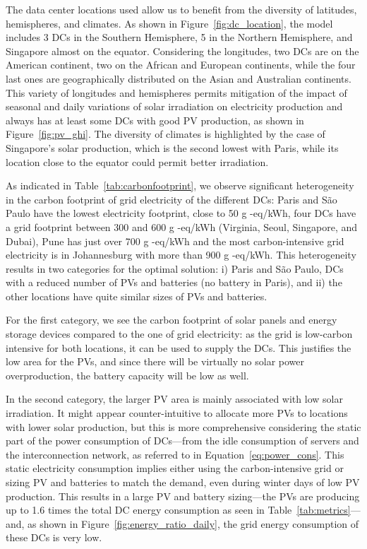 The data center locations used allow us to benefit from the diversity of latitudes, hemispheres, and climates. As shown in Figure~\ref{fig:dc_location}, the model includes 3 DCs in the Southern Hemisphere, 5 in the Northern Hemisphere, and Singapore almost on the equator. Considering the longitudes, two DCs are on the American continent, two on the African and European continents, while the four last ones are geographically distributed on the Asian and Australian continents. This variety of longitudes and hemispheres permits mitigation of the impact of seasonal and daily variations of solar irradiation on electricity production and always has at least some DCs with good PV production, as shown in Figure~\ref{fig:pv_ghi}. The diversity of climates is highlighted by the case of Singapore's solar production, which is the second lowest with Paris, while its location close to the equator could permit better irradiation.

As indicated in Table~\ref{tab:carbonfootprint}, we observe significant heterogeneity in the carbon footprint of grid electricity of the different DCs: Paris and S\~ao Paulo have the lowest electricity footprint, close to 50 g -eq/kWh, four DCs have a grid footprint between 300 and 600 g -eq/kWh (Virginia, Seoul, Singapore, and Dubai), Pune has just over 700 g -eq/kWh and the most carbon-intensive grid electricity is in Johannesburg with more than 900 g -eq/kWh. This heterogeneity results in two categories for the optimal solution: i) Paris and S\~ao Paulo, DCs with a reduced number of PVs and batteries (no battery in Paris), and ii) the other locations have quite similar sizes of PVs and batteries. 

For the first category, we see the carbon footprint of solar panels and energy storage devices compared to the one of grid electricity: as the grid is low-carbon intensive for both locations, it can be used to supply the DCs. This justifies the low area for the PVs, and since there will be virtually no solar power overproduction, the battery capacity will be low as well. 

In the second category, the larger PV area is mainly associated with low solar irradiation. It might appear counter-intuitive to allocate more PVs to locations with lower solar production, but this is more comprehensive considering the static part of the power consumption of DCs---from the idle consumption of servers and the interconnection network, as referred to in Equation~\eqref{eq:power_cons}. This static electricity consumption implies either using the carbon-intensive grid or sizing PV and batteries to match the demand, even during winter days of low PV production. This results in a large PV and battery sizing---the PVs are producing up to 1.6 times the total DC energy consumption as seen in Table~\ref{tab:metrics}---and, as shown in Figure~\ref{fig:energy_ratio_daily}, the grid energy consumption of these DCs is very low.


